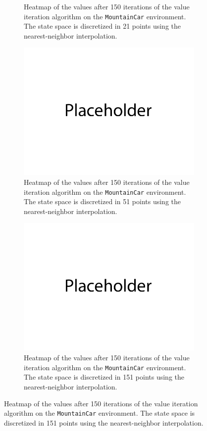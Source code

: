 \documentclass{article}
\begin{document}
\begin{enumerate}[(a)]
\begin{figure}[h!]
\begin{subfigure}{0.3\textwidth}
\caption{Heatmap of the values after 150 iterations of the value iteration algorithm on the \texttt{MountainCar} environment. 
                The state space is discretized in 21 points using the nearest-neighbor interpolation.}
    \end{subfigure}
    \hspace{0.1 in}
    \begin{subfigure}{0.3\textwidth}
        \centering
        \includegraphics[width=\textwidth]{figures/placeholder.png}
\caption{Heatmap of the values after 150 iterations of the value iteration algorithm on the \texttt{MountainCar} environment. 
                The state space is discretized in 51 points using the nearest-neighbor interpolation.}
    \end{subfigure}
        \hspace{0.1 in}
    \begin{subfigure}{0.3\textwidth}
        \centering
        \includegraphics[width=\textwidth]{figures/placeholder.png}
\caption{Heatmap of the values after 150 iterations of the value iteration algorithm on the \texttt{MountainCar} environment. 
                The state space is discretized in 151 points using the nearest-neighbor interpolation.}
    \end{subfigure}
\end{figure}


\end{enumerate}
\end{document}
